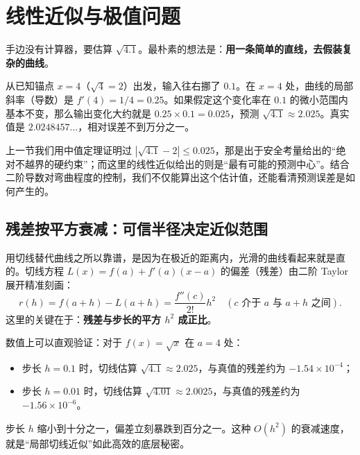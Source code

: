 \section{线性近似与极值问题}
\label{sec:02-Calculus/03-Differentiation/05}

手边没有计算器，要估算 \(\sqrt{4.1}\)。最朴素的想法是：\textbf{用一条简单的直线，去假装复杂的曲线}。

从已知锚点 \(x=4\)（\(\sqrt{4}=2\)）出发，输入往右挪了 \(0.1\)。在 \(x=4\) 处，曲线的局部斜率（导数）是 \(f'(4) = 1/4 = 0.25\)。如果假定这个变化率在 \(0.1\) 的微小范围内基本不变，那么输出变化大约就是 \(0.25 \times 0.1 = 0.025\)，预测 \(\sqrt{4.1} \approx 2.025\)。真实值是 \(2.0248457\ldots\)，相对误差不到万分之一。

上一节我们用中值定理证明过 \(|\sqrt{4.1}-2| \le 0.025\)，那是出于安全考量给出的``绝对不越界的硬约束''；而这里的线性近似给出的则是``最有可能的预测中心''。结合二阶导数对弯曲程度的控制，我们不仅能算出这个估计值，还能看清预测误差是如何产生的。

\subsection{残差按平方衰减：可信半径决定近似范围}

用切线替代曲线之所以靠谱，是因为在极近的距离内，光滑的曲线看起来就是直的。切线方程 \(L(x) = f(a) + f'(a)(x-a)\) 的偏差（残差）由二阶 Taylor 展开精准刻画：
\[
r(h) = f(a+h) - L(a+h) = \frac{f''(c)}{2!} h^2 \quad (c \text{ 介于 } a \text{ 与 } a+h \text{ 之间}).
\]
这里的关键在于：\textbf{残差与步长的平方 \(h^2\) 成正比}。

数值上可以直观验证：对于 \(f(x)=\sqrt{x}\) 在 \(a=4\) 处：
\begin{itemize}
    \item 步长 \(h=0.1\) 时，切线估算 \(\sqrt{4.1} \approx 2.025\)，与真值的残差约为 \(-1.54 \times 10^{-4}\)；
    \item 步长 \(h=0.01\) 时，切线估算 \(\sqrt{4.01} \approx 2.0025\)，与真值的残差约为 \(-1.56 \times 10^{-6}\)。
\end{itemize}
步长 \(h\) 缩小到十分之一，偏差立刻暴跌到百分之一。这种 \(O(h^2)\) 的衰减速度，就是``局部切线近似''如此高效的底层秘密。

